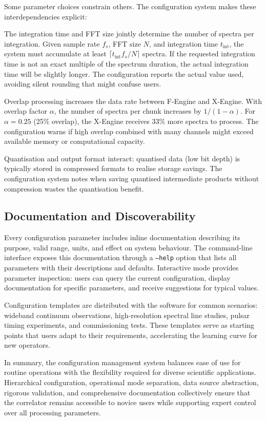 Some parameter choices constrain others. The configuration system makes these interdependencies explicit:

The integration time and FFT size jointly determine the number of spectra per integration. Given sample rate $f_s$, FFT size $N$, and integration time $t_{\text{int}}$, the system must accumulate at least $\lceil t_{\text{int}} f_s / N \rceil$ spectra. If the requested integration time is not an exact multiple of the spectrum duration, the actual integration time will be slightly longer. The configuration reports the actual value used, avoiding silent rounding that might confuse users.

Overlap processing increases the data rate between F-Engine and X-Engine. With overlap factor $\alpha$, the number of spectra per chunk increases by $1/(1-\alpha)$. For $\alpha = 0.25$ (25\% overlap), the X-Engine receives 33\% more spectra to process. The configuration warns if high overlap combined with many channels might exceed available memory or computational capacity.

Quantisation and output format interact: quantised data (low bit depth) is typically stored in compressed formats to realise storage savings. The configuration system notes when saving quantised intermediate products without compression wastes the quantisation benefit.

\subsection{Documentation and Discoverability}

Every configuration parameter includes inline documentation describing its purpose, valid range, units, and effect on system behaviour. The command-line interface exposes this documentation through a \texttt{--help} option that lists all parameters with their descriptions and defaults. Interactive mode provides parameter inspection: users can query the current configuration, display documentation for specific parameters, and receive suggestions for typical values.

Configuration templates are distributed with the software for common scenarios: wideband continuum observations, high-resolution spectral line studies, pulsar timing experiments, and commissioning tests. These templates serve as starting points that users adapt to their requirements, accelerating the learning curve for new operators.

In summary, the configuration management system balances ease of use for routine operations with the flexibility required for diverse scientific applications. Hierarchical configuration, operational mode separation, data source abstraction, rigorous validation, and comprehensive documentation collectively ensure that the correlator remains accessible to novice users while supporting expert control over all processing parameters.
